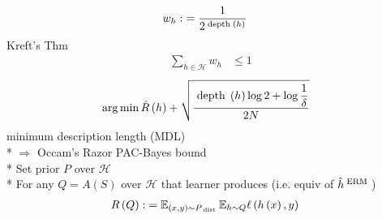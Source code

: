 \documentclass{article}
\begin{document}
\begin{align*}
w_{h} :&= \dfrac{1}{2^{\text{\;depth\;} \left(h\right)}}
\end{align*}
Kreft's Thm
\begin{align*}
\displaystyle\sum_{h \in \mathcal{H}} w_{h} &\leq  1
\end{align*}
\begin{align*}
&\arg\displaystyle\min \hat{R}\left(h\right) + \sqrt{\dfrac{\text{\;depth\;} \left(h\right) \log 2 + \log \dfrac{1}{\delta}}{2 N}}
\end{align*}
minimum description length (MDL)
\\* $\Rightarrow $ Occam's Razor
\newline \newline
PAC-Bayes bound
\\* Set prior $P $ over $\mathcal{H}$
\\* For any $Q  = A\left(S \right)$ over $\mathcal{H}$ that learner produces (i.e. equiv of $\hat{h} ^{\text{\;ERM\;}}$)
\begin{align*}
R\left(Q\right)  :&= \mathbb{E}_{\left(x, y\right) \sim  P_{\text{\;dist\;}}} \mathbb{E}_{h \sim  Q} \ell\left(h\left(x\right), y\right)
\end{align*}
\end{document}
